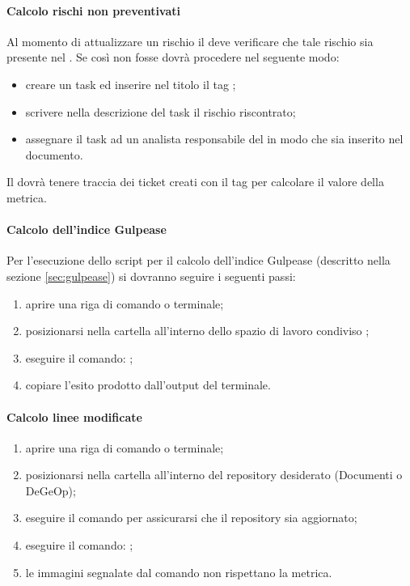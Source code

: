 	        \paragraph{Calcolo rischi non preventivati}\label{sec:rnp}
	        Al momento di attualizzare un rischio il \responsabilediprogetto{} deve verificare che tale rischio sia presente nel \pdp{}. Se così non fosse dovrà procedere nel seguente modo:
	        \begin{itemize}
	        	\item creare un task ed inserire nel titolo il tag \cit{[RISK]};
	        	\item scrivere nella descrizione del task il rischio riscontrato;
	        	\item assegnare il task ad un analista responsabile del \pdp{} in modo che sia inserito nel documento.
	        \end{itemize}
	        Il \responsabilediprogetto{} dovrà tenere traccia dei ticket creati con il tag \cit{[RISK]} per calcolare il valore della metrica.
	        \paragraph{Calcolo dell'indice Gulpease} \label{sec:calcoloGulpease}
	        Per l'esecuzione dello script per il calcolo dell'indice Gulpease (descritto nella sezione \ref{sec:gulpease}) si dovranno seguire i seguenti passi:
	        \begin{enumerate}
	        	\item aprire una riga di comando o terminale;
	        	\item posizionarsi nella cartella  all'interno dello spazio di lavoro condiviso ;
	        	\item eseguire il comando: ;
	        	\item copiare l'esito prodotto dall'output del terminale.
	        \end{enumerate}
	        \paragraph{Calcolo linee modificate} \label{sec:loc}
	        \begin{enumerate}
	        	\item aprire una riga di comando o terminale;
	        	\item posizionarsi nella cartella  all'interno del repository desiderato (Documenti o DeGeOp);
	        	\item eseguire il comando  per assicurarsi che il repository sia aggiornato;
	        	\item eseguire il comando: ;
	        	\item le immagini segnalate dal comando non rispettano la metrica.
	        \end{enumerate}

